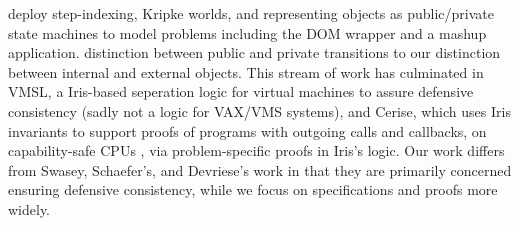 




 
\citet{dd} deploy
step-indexing, Kripke worlds, and representing objects
as public/private state machines %
to model 
problems including the 
DOM wrapper and a mashup application.
 distinction
between public and private transitions %
 to our
distinction between internal and external objects.
%
%
This stream of work has culminated in VMSL, a Iris-based seperation logic for
virtual machines to assure defensive consistency
\cite{vmsl-pldi2023}
(sadly not a logic for VAX/VMS systems),
%
%
and Cerise, which
uses Iris invariants to support proofs of programs
with outgoing calls and callbacks,
on capability-safe CPUs \cite{cerise-jacm2024},
via
problem-specific proofs in Iris's logic.
%
Our work differs from Swasey, Schaefer's, and Devriese's work in that
they are primarily concerned  %
ensuring defensive consistency, 
while we focus on specifications
and proofs more widely.
%
%
%
%


